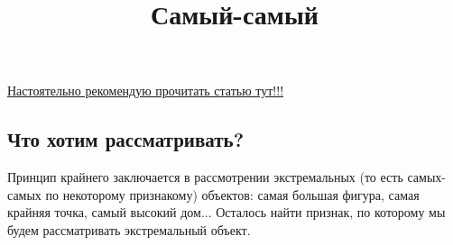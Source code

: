 \documentclass[a4paper,12pt]{article}
\title{Самый-самый}
\begin{document}
\maketitle
    \subsection*{} \href{https://kvant.mccme.ru/1988/09/pravilo_krajnego.htm}{Настоятельно рекомендую прочитать статью тут!!!}
    \subsection*{Что хотим рассматривать?} Принцип крайнего заключается в рассмотрении экстремальных (то есть самых-самых по некоторому признакому) объектов: самая большая фигура, самая крайняя точка, самый высокий дом... Осталось найти признак, по которому мы будем рассматривать экстремальный объект.
\end{document}
